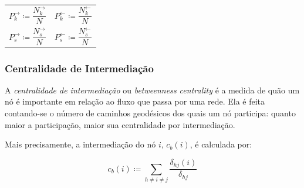 \documentclass[12pt,a4paper,final]{article}
\newcommand{\defn}{\coloneqq} %
\newcommand{\linkin}[1]{#1^\leftarrow} %
\newcommand{\linkout}[1]{#1^\rightarrow} %
\begin{document}
\noindent
\begin{tabularx}{\linewidth}{@{}XX@{}}
  \begin{equation} \label{eq:probabilidade-grau-saida}
  	\linkout{P}_k \defn \frac{\linkout{N}_k}{N}
  \end{equation} &
  \begin{equation} \label{eq:probabilidade-grau-entrada}
  	\linkin{P}_k \defn \frac{\linkin{N}_k}{N}
  \end{equation} \\
  \begin{equation} \label{eq:probabilidade-forca-saida}
  	\linkout{P}_s \defn \frac{\linkout{N}_s}{N}
  \end{equation} &
  \begin{equation} \label{eq:probabilidade-forca-entrada}
  	\linkin{P}_s \defn \frac{\linkin{N}_s}{N}
  \end{equation}
\end{tabularx}

\subsubsection{Centralidade de Intermediação}

A \textit{centralidade de intermediação} ou \textit{betweenness centrality} é a medida de quão um nó é importante em relação ao fluxo que passa por uma rede. Ela é feita contando-se o número de caminhos geodésicos dos quais um nó participa: quanto maior a participação, maior sua centralidade por intermediação.

Mais precisamente, a intermediação do nó $i$, $c_b(i)$, é calculada por:

\begin{equation}
c_b(i) \defn \sum_{h \neq i \neq j} \frac{\delta_{hj}(i)}{\delta_{hj}}
\end{equation}
\end{document}
